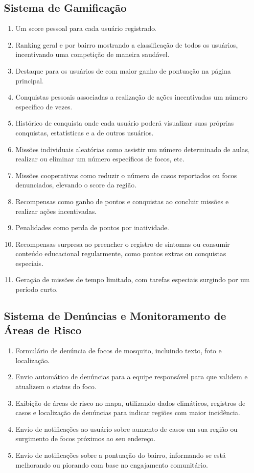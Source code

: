 \documentclass[a5paper, 12pt]{article}
\begin{document}
\subsection{Sistema de Gamificação}
\begin{enumerate}
    \item Um score pessoal para cada usuário registrado.
    \item Ranking geral e por bairro mostrando a classificação de todos os usuários, incentivando uma competição de maneira saudável.
    \item Destaque para os usuários de com maior ganho de pontuação na página principal.
    \item Conquistas pessoais associadas a realização de ações incentivadas um número específico de vezes.
    \item Histórico de conquista onde cada usuário poderá visualizar suas próprias conquistas, estatísticas e a de outros usuários.
    \item Missões individuais aleatórias como assistir um número determinado de aulas, realizar ou eliminar um número específicos de focos, etc.
    \item Missões cooperativas como reduzir o número de casos reportados ou focos denunciados, elevando o score da região.
    \item Recompensas como ganho de pontos e conquistas ao concluir missões e realizar ações incentivadas.
    \item Penalidades como perda de pontos por inatividade.
    \item Recompensas surpresa ao preencher o registro de sintomas ou consumir conteúdo educacional regularmente, como pontos extras ou conquistas especiais.
    \item Geração de missões de tempo limitado, com tarefas especiais surgindo por um período curto.
\end{enumerate}

\subsection{Sistema de Denúncias e Monitoramento de Áreas de Risco}
\begin{enumerate}
    \item Formulário de denúncia de focos de mosquito, incluindo texto, foto e localização.
    \item Envio automático de denúncias para a equipe responsável para que validem e atualizem o status do foco. 
    \item Exibição de áreas de risco no mapa, utilizando dados climáticos, registros de casos e localização de denúncias para indicar regiões com maior incidência.
    \item Envio de notificações ao usuário sobre aumento de casos em sua região ou surgimento de focos próximos ao seu endereço.
    \item Envio de notificações sobre a pontuação do bairro, informando se está melhorando ou piorando com base no engajamento comunitário.
\end{enumerate}
\end{document}
